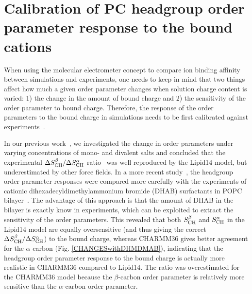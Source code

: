 \documentclass[journal=jpcbfk,manuscript=article]{achemso}
\begin{document}
\pagebreak
\section{Calibration of PC headgroup order parameter response to the bound cations}\label{electrometerCALIBRATION}
When using the molecular electrometer concept to compare ion binding affinity between simulations
and experiments, one needs to keep in mind that two things affect how much a given order parameter changes when solution charge content is varied: 1) the change in the amount of bound charge and 2) the sensitivity of the order parameter to bound charge. Therefore, the response of the order parameters to the bound charge in simulations needs to be first calibrated
against experiments~\cite{catte16,melcr18}. 

In our previous work~\cite{catte16}, we investigated the change in order parameters under varying concentrations of mono- and divalent salts and concluded that the experimental $\Delta S_{\rm CH}^\beta / \Delta S_{\rm CH}^\alpha$ ratio~\cite{akutsu81} was well reproduced by the Lipid14 model, but underestimated by other force fields. In a more recent study~\cite{melcr18},
the headgroup order parameter responses were compared more carefully with the experiments of
cationic dihexadecyldimethylammonium bromide (DHAB) surfactants in POPC bilayer~\cite{scherer89}. The advantage of this approach is that the amount of DHAB in the bilayer is exactly know in experiments, which can be exploited to extract the sensitivity of the order parameters.
This revealed that both $S_{\rm CH}^\beta$ and $S_{\rm CH}^\alpha$ in the Lipid14 model are equally oversensitive (and thus giving the correct $\Delta S_{\rm CH}^\beta / \Delta S_{\rm CH}^\alpha$) to the bound charge,
whereas CHARMM36 gives better agreement for the $\alpha$ carbon (Fig. \ref{CHANGESwithDHMDMAB}), indicating that the headgroup order parameter response to the bound charge is actually more realistic
in CHARMM36 compared to Lipid14. The ratio was overestimated for the CHARMM36 model because the $\beta$-carbon order parameter
is relatively more sensitive than the $\alpha$-carbon order parameter. 
\end{document}
